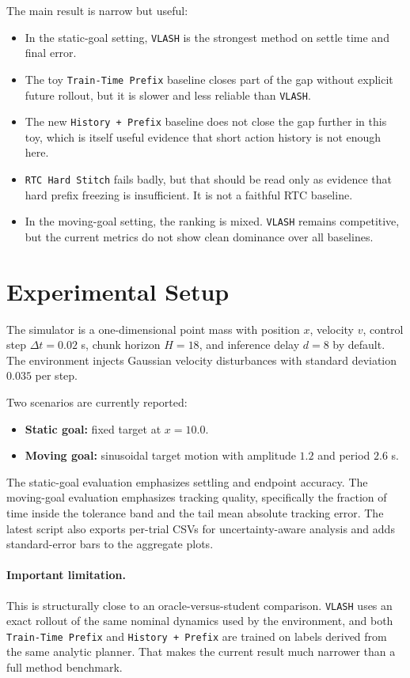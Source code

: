 \documentclass[11pt]{article}
\begin{document}
The main result is narrow but useful:
\begin{itemize}[leftmargin=1.5em]
  \item In the static-goal setting, \texttt{VLASH} is the strongest method on settle time and final error.
  \item The toy \texttt{Train-Time Prefix} baseline closes part of the gap without explicit future rollout, but it is slower and less reliable than \texttt{VLASH}.
  \item The new \texttt{History + Prefix} baseline does not close the gap further in this toy, which is itself useful evidence that short action history is not enough here.
  \item \texttt{RTC Hard Stitch} fails badly, but that should be read only as evidence that hard prefix freezing is insufficient. It is not a faithful RTC baseline.
  \item In the moving-goal setting, the ranking is mixed. \texttt{VLASH} remains competitive, but the current metrics do not show clean dominance over all baselines.
\end{itemize}

\section{Experimental Setup}

The simulator is a one-dimensional point mass with position \(x\), velocity \(v\), control step \(\Delta t = 0.02\) s, chunk horizon \(H = 18\), and inference delay \(d = 8\) by default. The environment injects Gaussian velocity disturbances with standard deviation \(0.035\) per step.

Two scenarios are currently reported:
\begin{itemize}[leftmargin=1.5em]
  \item \textbf{Static goal:} fixed target at \(x = 10.0\).
  \item \textbf{Moving goal:} sinusoidal target motion with amplitude \(1.2\) and period \(2.6\) s.
\end{itemize}

The static-goal evaluation emphasizes settling and endpoint accuracy. The moving-goal evaluation emphasizes tracking quality, specifically the fraction of time inside the tolerance band and the tail mean absolute tracking error. The latest script also exports per-trial CSVs for uncertainty-aware analysis and adds standard-error bars to the aggregate plots.

\paragraph{Important limitation.}
This is structurally close to an oracle-versus-student comparison. \texttt{VLASH} uses an exact rollout of the same nominal dynamics used by the environment, and both \texttt{Train-Time Prefix} and \texttt{History + Prefix} are trained on labels derived from the same analytic planner. That makes the current result much narrower than a full method benchmark.
\end{document}
